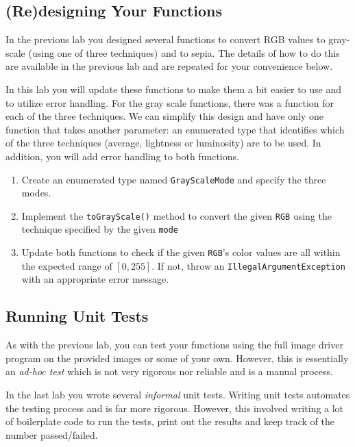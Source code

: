 \documentclass[12pt]{scrartcl}
\begin{document}
\subsection{(Re)designing Your Functions}

In the previous lab you designed several functions to convert RGB
values to gray-scale (using one of three techniques) and to sepia.
The details of how to do this are available in the previous lab and 
are repeated for your convenience below.  

In this lab you will update these functions to make them a bit
easier to use and to utilize error handling.  For the
gray scale functions, there was a function for each of the three 
techniques.  We can simplify this design and have only one function
that takes another parameter: an enumerated type that identifies
which of the three techniques (average, lightness or luminosity)
are to be used.  In addition, you will add error handling to 
both functions.

\begin{enumerate}
  \item Create an enumerated type named \texttt{GrayScaleMode}
  and specify the three modes. 
  \item Implement the \texttt{toGrayScale()} method
  to convert the given \texttt{RGB} using the technique
  specified by the given \texttt{mode}
  \item Update both functions to check if the given \texttt{RGB}'s
  color values are all within the expected range of $[0, 255]$.  If not,
  throw an \texttt{IllegalArgumentException} with an
  appropriate error message.
\end{enumerate}

\subsection{Running Unit Tests}

As with the previous lab, you can test your functions using 
the full image driver program on the provided images or some
of your own.  However, this is essentially an 
\emph{ad-hoc test} which is not very rigorous nor reliable 
and is a manual process.  

In the last lab you wrote several \emph{informal} unit tests.  
Writing unit tests automates the testing process and is far more
rigorous.  However, this involved writing a lot of boilerplate 
code to run the tests, print out the results and keep track 
of the number passed/failed.  
\end{document}
